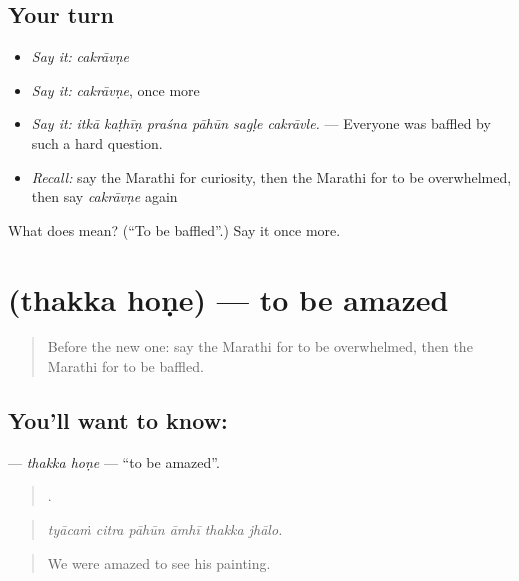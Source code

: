 \subsection*{Your turn}
\begin{itemize}
\raggedright
  \item \emph{Say it:} \emph{cakrāvṇe}
  \item \emph{Say it:} \emph{cakrāvṇe}, once more
  \item \emph{Say it:} \emph{itkā kaṭhīṇ praśna pāhūn sagḷe cakrāvle.} — Everyone was baffled by such a hard question.
  \item \emph{Recall:} say the Marathi for curiosity, then the Marathi for to be overwhelmed, then say \emph{cakrāvṇe} again
\end{itemize}

\begin{tcolorbox}[breakable,colback=teal!4,colframe=teal!35!black,title={Before you move on}]
What does  mean? (\textquotedblleft{}To be baffled\textquotedblright{}.) Say it once more.
\end{tcolorbox}
\section[\texorpdfstring{\mr{थक्क} \mr{होणे} (thakka hoṇe)}{थक्क होणे (thakka hoṇe)}]{  (thakka hoṇe) — to be amazed}

\label{lesson:MR-C465-thakka-hone}



\begin{quote}
Before the new one: say the Marathi for to be overwhelmed, then the Marathi for to be baffled.
\end{quote}

\subsection*{You'll want to know:  }
\textbf{ } — \emph{thakka hoṇe} — \textquotedblleft{}to be amazed\textquotedblright{}.

\begin{quote}
     .
\end{quote}

\begin{quote}
\emph{tyācaṁ citra pāhūn āmhī thakka jhālo.}
\end{quote}

\begin{quote}
We were amazed to see his painting.
\end{quote}

